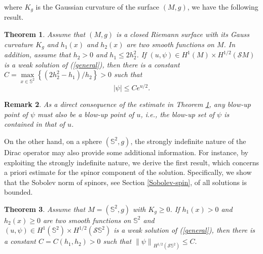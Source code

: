 \documentclass[a4paper, 12pt]{article}
\newtheorem{theorem}{Theorem}[section]
\newtheorem{remark}[theorem]{Remark}
\def\slashiii#1{\setbox0=\hbox{$#1$}#1\hskip-\wd0\hbox to\wd0{\hss\sl/\/\hss}}
\begin{document}
	where \( K_g \) is the Gaussian curvature of the surface \(({M}, g)\), we have the following result.
	\begin{theorem}\label{thm-principle}
		Assume that \( (M,g) \) is a closed Riemann surface with its Gauss curvature $K_g$ and $h_1(x)$ and $h_2(x)$ are two smooth functions on $M$. In addition, assume that \( h_2 > 0 \) and \( h_1 \leq 2h_2^2 \). If $(u,\psi)\in H^1(M)\times H^{1/2}( \mathcal{S}M )$ is a weak solution of (\ref{general}), then there is a constant $C=\mathop {\max }\limits_{x \in {\mathbb{S}^2}} \left\{ {\left( {2h_2^2 - {h_1}} \right)/{h_2}} \right\}>0$ such that	\[{\left| \psi  \right|} \leq C{e^{u/2}}.\]
	\end{theorem}
	\begin{remark}
		As a direct consequence of the estimate in Theorem \ref{thm-principle}, any blow-up point of \(\psi\) must also be a blow-up point of \(u\), i.e., the blow-up set of \(\psi\) is contained in that of \(u\).
	\end{remark}
	On the other hand, on a sphere $(\mathbb{S}^2,g)$, the strongly indefinite nature of the Dirac operator may also provide some additional information. For instance, by exploiting the strongly indefinite nature, we derive the first result, which concerns a priori estimate for the spinor component of the solution. Specifically, we show that the Sobolev norm of spinors, see Section \ref{Sobolev-spin}, of all solutions is bounded.
\begin{theorem}\label{thm1}
	Assume that $M=(\mathbb{S}^2,g)$ with \( K_g \geq 0 \). If $h_1(x)>0$ and $h_2(x)\geq 0$ are two smooth functions on $\mathbb{S}^2$ and $(u,\psi)\in H^1(\mathbb{S}^2)\times H^{1/2}( \mathcal{S}\mathbb{S}^2 )$ is a weak solution of (\ref{general}), then there is a constant $C=C(h_1,h_2)>0$ such that	$\left\| \psi  \right\|_{{H^{1/2}}\left( \mathcal{S}\mathbb{S}^2 \right)} \leq C.$
\end{theorem}
\end{document}
